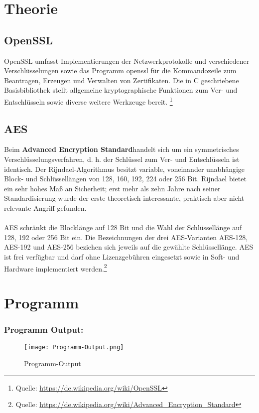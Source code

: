 \newpage

\section{Theorie}
\subsection{OpenSSL}
OpenSSL umfasst Implementierungen der Netzwerkprotokolle und verschiedener
Verschlüsselungen sowie das Programm openssl für die Kommandozeile zum Beantragen, 
Erzeugen und Verwalten von Zertifikaten. Die in C geschriebene Basisbibliothek stellt allgemeine 
kryptographische Funktionen zum Ver- und Entschlüsseln sowie diverse weitere Werkzeuge bereit.
\footnote{Quelle: \url{https://de.wikipedia.org/wiki/OpenSSL}}


\subsection{AES}
Beim \textbf{Advanced Encryption Standard}handelt sich um ein symmetrisches Verschlüsselungsverfahren, d. h. 
der Schlüssel zum Ver- und Entschlüsseln ist identisch. Der Rijndael-Algorithmus besitzt variable, voneinander unabhängige Block- und 
Schlüssellängen von 128, 160, 192, 224 oder 256 Bit. Rijndael bietet ein sehr hohes Maß an Sicherheit; erst mehr als zehn Jahre nach seiner 
Standardisierung wurde der erste theoretisch interessante, praktisch aber nicht relevante Angriff gefunden.
\\
\\
AES schränkt die Blocklänge auf 128 Bit und die Wahl der Schlüssellänge auf 128, 192 oder 256 Bit ein. Die Bezeichnungen der
drei AES-Varianten AES-128, AES-192 und AES-256 beziehen sich jeweils auf die gewählte Schlüssellänge. AES ist frei verfügbar 
und darf ohne Lizenzgebühren eingesetzt sowie in Soft- und Hardware implementiert werden.\footnote{Quelle: \url{https://de.wikipedia.org/wiki/Advanced_Encryption_Standard}}


\newpage
\section{Programm}





\subsubsection{Programm Output:}
\begin{figure}[!htb]
    \centering
    \texttt{[image: Programm-Output.png]}
    \caption{Programm-Output}
    \label{caption:Programm-Output}
\end{figure}
